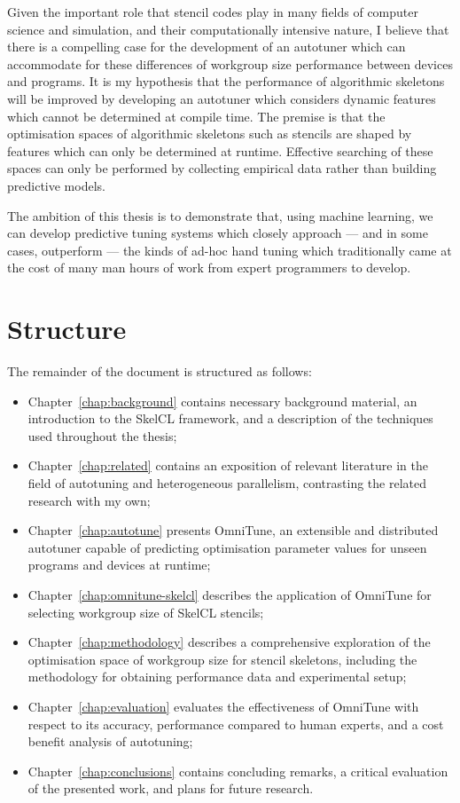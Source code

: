 Given the important role that stencil codes play in many fields of
computer science and simulation, and their computationally intensive
nature, I believe that there is a compelling case for the development
of an autotuner which can accommodate for these differences of
workgroup size performance between devices and programs. It is my
hypothesis that the performance of algorithmic skeletons will be
improved by developing an autotuner which considers dynamic features
which cannot be determined at compile time. The premise is that the
optimisation spaces of algorithmic skeletons such as stencils are
shaped by features which can only be determined at runtime. Effective
searching of these spaces can only be performed by collecting
empirical data rather than building predictive models.

The ambition of this thesis is to demonstrate that, using machine
learning, we can develop predictive tuning systems which closely
approach --- and in some cases, outperform --- the kinds of ad-hoc
hand tuning which traditionally came at the cost of many man hours of
work from expert programmers to develop.


\section{Structure}

The remainder of the document is structured as follows:
%
\begin{itemize}
\item Chapter~\ref{chap:background} contains necessary background
  material, an introduction to the SkelCL framework, and a description
  of the techniques used throughout the thesis;
\item Chapter~\ref{chap:related} contains an exposition of relevant
  literature in the field of autotuning and heterogeneous parallelism,
  contrasting the related research with my own;
\item Chapter~\ref{chap:autotune} presents OmniTune, an extensible and
  distributed autotuner capable of predicting optimisation parameter
  values for unseen programs and devices at runtime;
\item Chapter~\ref{chap:omnitune-skelcl} describes the application of
  OmniTune for selecting workgroup size of SkelCL stencils;
\item Chapter~\ref{chap:methodology} describes a comprehensive
  exploration of the optimisation space of workgroup size for stencil
  skeletons, including the methodology for obtaining performance data
  and experimental setup;
\item Chapter~\ref{chap:evaluation} evaluates the effectiveness of
  OmniTune with respect to its accuracy, performance compared to human
  experts, and a cost benefit analysis of autotuning;
\item Chapter~\ref{chap:conclusions} contains concluding remarks, a
  critical evaluation of the presented work, and plans for future
  research.
\end{itemize}


